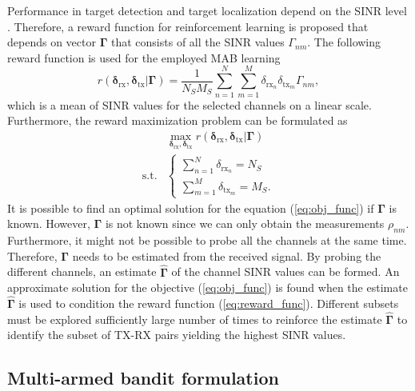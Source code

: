 \documentclass[english, 12pt, a4paper, elec, utf8, a-1b, online]{aaltothesis}
\newcommand{\esinrexp}{\Gamma_{nm}}
\newcommand{\vsinrexp}{\boldsymbol{\Gamma}}
\newcommand{\vsinrb}{\widehat{\boldsymbol{\Gamma}}}
\newcommand{\easvtx}{\delta_{\text{tx}_m}}
\newcommand{\vasvtx}{\boldsymbol{\delta}_{\text{tx}}}
\newcommand{\easvrx}{\delta_{\text{rx}_n}}
\newcommand{\vasvrx}{\boldsymbol{\delta}_{\text{rx}}}
\newcommand{\esp}{\rho_{nm}}
\begin{document}
Performance in target detection and target localization depend on the SINR level \cite{Aittomäki2011, Godrich2011, Sun2014}.
Therefore, a reward function for reinforcement learning is proposed that depends on vector $\vsinrexp$ that consists of all the SINR values $\esinrexp$.
The following reward function is used for the employed MAB learning
\begin{equation}\label{eq:reward_func}
    r(\vasvrx, \vasvtx | \vsinrexp) = \frac{1}{N_S M_S}\sum_{n=1}^N \sum_{m=1}^M  \easvrx \easvtx \esinrexp,
\end{equation}
which is a mean of SINR values for the selected channels on a linear scale.
Furthermore, the reward maximization problem can be formulated as
\begin{equation}\label{eq:obj_func}
    \begin{array}{ll}
                &   \max_{\vasvrx, \vasvtx} r(\vasvrx, \vasvtx | \vsinrexp) \\[7pt]
    \text{s.t.} &   
                \left\{\begin{array}{l}
                    \sum_{n=1}^N \easvrx = N_S \\
                    \sum_{m=1}^M \easvtx = M_S.
                \end{array}\right.
    \end{array}
\end{equation}
It is possible to find an optimal solution for the equation (\ref{eq:obj_func}) if $\vsinrexp$ is known.
However, $\vsinrexp$ is not known since we can only obtain the measurements $\esp$. 
Furthermore, it might not be possible to probe all the channels at the same time.
Therefore, $\vsinrexp$ needs to be estimated from the received signal. 
By probing the different channels, an estimate $\vsinrb$ of the channel SINR values can be formed.
An approximate solution for the objective (\ref{eq:obj_func}) is found when the estimate $\vsinrb$ is used to condition the reward function (\ref{eq:reward_func}).
Different subsets must be explored sufficiently large number of times to reinforce the estimate $\vsinrb$ to identify the subset of TX-RX pairs yielding the highest SINR values.


\subsection{Multi-armed bandit formulation}
\end{document}

